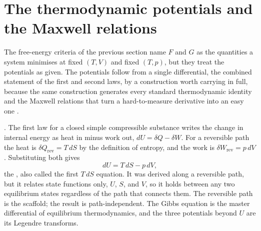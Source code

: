 



\section{The thermodynamic potentials and the Maxwell relations}

The free-energy criteria of the previous section name $F$ and $G$ as the
quantities a system minimises at fixed $(T,V)$ and fixed $(T,p)$, but they
treat the potentials as given. The potentials follow from a single
differential, the combined statement of the first and second laws, by a
construction worth carrying in full, because the same construction generates
every standard thermodynamic identity and the Maxwell relations that turn a
hard-to-measure derivative into an easy one \cite[ch.~5]{text:v6c02-callen-thermodynamics-1985}.

. The first law for a closed simple compressible
substance writes the change in internal energy as heat in minus work out,
$dU = \delta Q - \delta W$. For a reversible path the heat is $\delta Q_{\text{rev}}
= T\,dS$ by the definition of entropy, and the work is $\delta W_{\text{rev}} =
p\,dV$. Substituting both gives
\[
dU = T\,dS - p\,dV,
\]
the , also called the first $T\,dS$ equation. It was
derived along a reversible path, but it relates state functions only, $U$, $S$,
and $V$, so it holds between any two equilibrium states regardless of the path
that connects them. The reversible path is the scaffold; the result is
path-independent. The Gibbs equation is the master differential of equilibrium
thermodynamics, and the three potentials beyond $U$ are its Legendre transforms.

